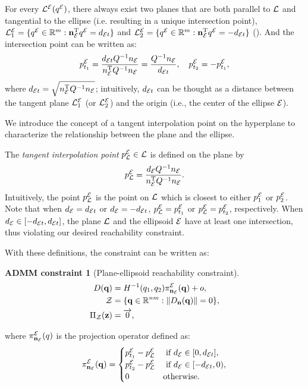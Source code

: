 \documentclass[10pt,twocolumn,twoside]{IEEEtran}
\newtheorem{constraint}{ADMM constraint}
\def\sZ{\mathcal{Z}}
\begin{document}
For every ${\mathcal{L}^{\mathcal{E}}}({q^{\mathcal{E}}})$, there always exist two planes that are both parallel to $\mathcal{L}$ and tangential to the ellipse (i.e. resulting in a unique intersection point), $\mathcal{L}_1^{\mathcal{E}} = \{{q^{\mathcal{E}}}\in\mathbb{R}^m: \mathbf{n}_{\mathcal{E}} ^\mathrm{T} {q^{\mathcal{E}}} =  d_{\mathcal{E} t} \}$ and $\mathcal{L}_2^{\mathcal{E}} = \{{q^{\mathcal{E}}}\in\mathbb{R}^m: \mathbf{n}_{\mathcal{E}} ^\mathrm{T} {q^{\mathcal{E}}} = - d_{\mathcal{E} t} \}$  (). And the intersection point can be written as:
\begin{equation}
    p^{\mathcal{E}}_{t_{1}} = \frac{ d_{\mathcal{E} t} Q^{-1}   n_{\mathcal{E}}}{ n_{\mathcal{E}} ^\mathrm{T} Q^{-1}  n_{\mathcal{E}}} = \frac{Q^{-1} n_{\mathcal{E}}}{ d_{\mathcal{E} t}},\quad  p^{\mathcal{E}}_{t_{2}} = -  p^{\mathcal{E}}_{t_{1}},
\end{equation}
where $d_{\mathcal{E} t} = \sqrt{ n_{\mathcal{E}}^\mathrm{T} Q^{-1} n_{\mathcal{E}}}$; intuitively, $d_{\mathcal{E} t}$ can be thought as a distance between the tangent plane $\mathcal{L}_1^{\mathcal{E}}$ (or $\mathcal{L}_2^{\mathcal{E}}$) and the origin (i.e., the center of the ellipse $\mathcal{E}$).

We introduce the concept of a tangent interpolation point on the hyperplane to characterize the relationship between the plane and the ellipse.

\begin{definition}
The \emph{tangent interpolation point} $p^{\mathcal{E}}_{\mathcal{L}} \in \mathcal{L}$ is defined on the plane by 
    \begin{equation}\label{equ:ProjectPoint}
      p^{\mathcal{E}}_{\mathcal{L}} = \frac{ d_{\mathcal{E}} Q^{-1} n_{\mathcal{E}}}{ n_{\mathcal{E}}^\mathrm{T} Q^{-1} n_{\mathcal{E}}}.
    \end{equation}
  Intuitively, the point $p^{\mathcal{E}}_{\mathcal{L}}$ is the point on $\mathcal{L}$ which is closest to either $p^{\mathcal{E}}_1$ or $p^{\mathcal{E}}_2$.
  Note that when  $d_{\mathcal{E}}=d_{\mathcal{E} t}$ or $d_{\mathcal{E}}=-d_{\mathcal{E} t}$, $p^{\mathcal{E}}_{\mathcal{L}}=p^{\mathcal{E}}_{t_1}$ or $p^{\mathcal{E}}_{\mathcal{L}}=p^{\mathcal{E}}_{t_2}$, respectively. When $ d_{\mathcal{E}} \in [- d_{\mathcal{E} t},  d_{\mathcal{E} t}]$, the plane $\mathcal{L}$ and the ellipsoid $\mathcal{E}$ have at least one intersection, thus violating our desired reachability constraint. 
\end{definition}

With these definitions, the constraint can be written as:

\begin{constraint}[Plane-ellipsoid reachability constraint]
\begin{align}
D(\vq) &= H^{-1}(q_{1},q_2)\pi^\cE_{\vn_\cE}(\vq)+o, \label{eq:plane_ellipsoid_constraint}\\
  \sZ &= \{\vq\in\mathbb{R}^{nm}:\norm{D_{\vn}(\vq)} = 0 \},\\
   \Pi_\sZ(\vz) & = \overrightarrow{0}, 
\end{align}
\end{constraint}
where $\pi^{\mathcal{E}}_{\mathbf{n}_{\mathcal{E}}}(q)$ is the projection operator defined as:
  \begin{equation}\label{equ:plane2ellipse}
    \pi^{\mathcal{E}}_{\mathbf{n}_{\mathcal{E}}}(\mathbf{q}) =\begin{cases}
      p^{\mathcal{E}}_{t_1}-p^{\mathcal{E}}_{\mathcal{L}} & \textrm{ if } d_{\mathcal{E}} \in [0, d_{\mathcal{E} t}], \\
      p^{\mathcal{E}}_{t_2}-p^{\mathcal{E}}_{\mathcal{L}} &  \textrm{ if } d_{\mathcal{E}} \in [- d_{\mathcal{E} t},0), \\
      {0} & \textrm{otherwise}.
    \end{cases}
  \end{equation}
\end{document}
